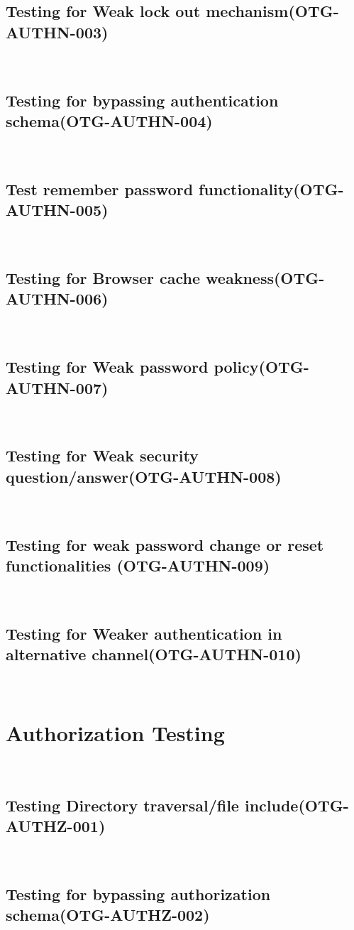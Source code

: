 \documentclass[headsepline,footsepline,footinclude=false,oneside,fontsize=11pt,paper=a4,listof=totoc,bibliography=totoc]{scrbook} %
\begin{document}
\subsection{Testing for Weak lock out mechanism(OTG-AUTHN-003)}\
\pagebreak 
\subsection{Testing for bypassing authentication schema(OTG-AUTHN-004)}\
\pagebreak 
\subsection{Test remember password functionality(OTG-AUTHN-005)}\
\pagebreak 
\subsection{Testing for Browser cache weakness(OTG-AUTHN-006)}\
\pagebreak 
\subsection{Testing for Weak password policy(OTG-AUTHN-007)}\
\pagebreak 
\subsection{Testing for Weak security question/answer(OTG-AUTHN-008)}\
\pagebreak 
\subsection{Testing for weak password change or reset functionalities (OTG-AUTHN-009)}\
\pagebreak 
\subsection{Testing for Weaker authentication in alternative channel(OTG-AUTHN-010)}\
 
\pagebreak 
\section{Authorization Testing}\
\subsection{Testing Directory traversal/file include(OTG-AUTHZ-001)}\
\pagebreak 
\subsection{Testing for bypassing authorization schema(OTG-AUTHZ-002)}\
\pagebreak 
\end{document}
